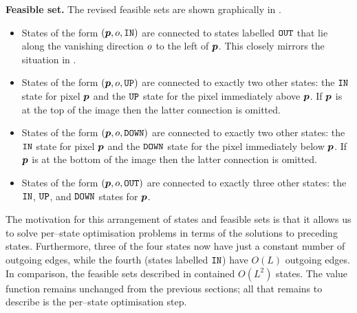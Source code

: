 \textbf{Feasible set.} The revised feasible sets are shown graphically
in .
\begin{itemize}
  \item{States of the form $(\Pixel,\WallOrient,\INlabel)$ are
    connected to states labelled $\OUTlabel$ that lie along the
    vanishing direction $\WallOrient$ to the left of $\Pixel$. This
    closely mirrors the situation in .}
  \item{States of the form $(\Pixel,\WallOrient,\UPlabel)$ are
    connected to exactly two other states: the $\INlabel$ state for
    pixel $\Pixel$ and the $\UPlabel$ state for the pixel immediately
    above $\Pixel$. If $\Pixel$ is at the top of the image then the
    latter connection is omitted.}
  \item{States of the form $(\Pixel,\WallOrient,\DOWNlabel)$ are
    connected to exactly two other states: the $\INlabel$ state for
    pixel $\Pixel$ and the $\DOWNlabel$ state for the pixel
    immediately below $\Pixel$. If $\Pixel$ is at the bottom of the
    image then the latter connection is omitted.}
  \item{States of the form $(\Pixel,\WallOrient,\OUTlabel)$ are
    connected to exactly three other states: the $\INlabel$,
    $\UPlabel$, and $\DOWNlabel$ states for $\Pixel$.}
\end{itemize}

The motivation for this arrangement of states and feasible sets is
that it allows us to solve per--state optimisation problems in terms
of the solutions to preceding states. Furthermore, three of the four
states now have just a constant number of outgoing edges, while the
fourth (states labelled $\INlabel$) have $O(L)$ outgoing edges. In
comparison, the feasible sets described in 
contained $O(L^2)$ states. The value function remains unchanged from
the previous sections; all that remains to describe is the per--state
optimisation step.

